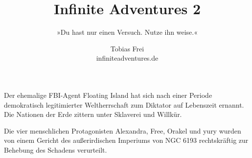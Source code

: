 

\newcommand{\ialoudspeaker}{\textit} %
\newcommand{\iaquote}{\textit} %
\newcommand{\iashout}{\emph} %
\newcommand{\iathought}{\emph} %



\pagestyle{plain}

\title{Infinite Adventures 2}

\subtitle{»Du hast nur einen Versuch. Nutze ihn weise.«}

\author{Tobias Frei\\ infiniteadventures.de}

\date{} %

\dedication{für Mirco Hensel und yury\\ in Erinnerung an Douglas Adams}


Der ehemalige FBI-Agent Floating Island hat sich nach einer Periode demokratisch legitimierter Weltherrschaft zum Diktator auf Lebenszeit ernannt. Die Nationen der Erde zittern unter Sklaverei und Willkür.



\noindent Die vier menschlichen Protagonisten Alexandra, Free, Orakel und yury wurden von einem Gericht des außerirdischen Imperiums von NGC 6193 rechtskräftig zur Behebung des Schadens verurteilt.

